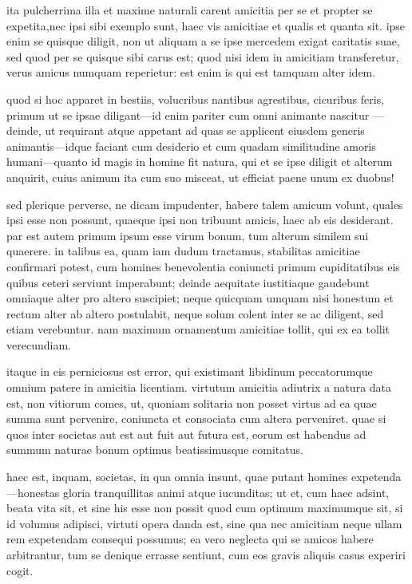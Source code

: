  ita pulcherrima illa et maxime naturali carent amicitia per se et propter se expetita,nec ipsi sibi exemplo sunt, haec vis amicitiae et qualis et quanta sit. ipse enim se quisque diligit, non ut aliquam a se ipse mercedem exigat caritatis suae, sed quod per se quisque sibi carus est; quod nisi idem in amicitiam transferetur, verus amicus numquam reperietur: est enim is qui est tamquam alter idem.

 quod si hoc apparet in bestiis, volucribus nantibus agrestibus, cicuribus feris, primum ut se ipsae diligant—id enim pariter cum omni animante nascitur —deinde, ut requirant atque appetant ad quas se applicent eiusdem generis animantis—idque faciant cum desiderio et cum quadam similitudine amoris humani—quanto id magis in homine fit natura, qui et se ipse diligit et alterum anquirit, cuius animum ita cum suo misceat, ut efficiat paene unum ex duobus!

 sed plerique perverse, ne dicam impudenter, habere talem amicum volunt, quales ipsi esse non possunt, quaeque ipsi non tribuunt amicis, haec ab eis desiderant. par est autem primum ipsum esse virum bonum, tum alterum similem sui quaerere. in talibus ea, quam iam dudum tractamus, stabilitas amicitiae confirmari potest, cum homines benevolentia coniuncti primum cupiditatibus eis quibus ceteri serviunt imperabunt; deinde aequitate iustitiaque gaudebunt omniaque alter pro altero suscipiet; neque quicquam umquam nisi honestum et rectum alter ab altero postulabit, neque solum colent inter se ac diligent, sed etiam verebuntur. nam maximum ornamentum amicitiae tollit, qui ex ea tollit verecundiam.

 itaque in eis perniciosus est error, qui existimant libidinum peccatorumque omnium patere in amicitia licentiam. virtutum amicitia adiutrix a natura data est, non vitiorum comes, ut, quoniam solitaria non posset virtus ad ea quae summa sunt pervenire, coniuncta et consociata cum altera perveniret. quae si quos inter societas aut est aut fuit aut futura est, eorum est habendus ad summum naturae bonum optimus beatissimusque comitatus.

 haec est, inquam, societas, in qua omnia insunt, quae putant homines expetenda—honestas gloria tranquillitas animi atque iucunditas; ut et, cum haec adsint, beata vita sit, et sine his esse non possit quod cum optimum maximumque sit, si id volumus adipisci, virtuti opera danda est, sine qua nec amicitiam neque ullam rem expetendam consequi possumus; ea vero neglecta qui se amicos habere arbitrantur, tum se denique errasse sentiunt, cum eos gravis aliquis casus experiri cogit.

